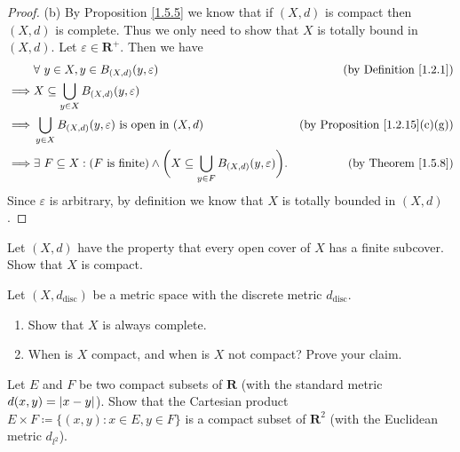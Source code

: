 \begin{proof}{(b)}
    By Proposition \ref{1.5.5} we know that if \((X, d)\) is compact then \((X, d)\) is complete.
    Thus we only need to show that \(X\) is totally bound in \((X, d)\).
    Let \(\varepsilon \in \mathbf{R}^+\).
    Then we have
    \begin{align*}
                 & \forall\ y \in X, y \in B_{(X, d)}(y, \varepsilon)                                                                         & \text{(by Definition \ref{1.2.1})}         \\
        \implies & X \subseteq \bigcup_{y \in X} B_{(X, d)}(y, \varepsilon)                                                                                                                \\
        \implies & \bigcup_{y \in X} B_{(X, d)}(y, \varepsilon) \text{ is open in } (X, d)                                                    & \text{(by Proposition \ref{1.2.15}(c)(g))} \\
        \implies & \exists\ F \subseteq X : (F \text{ is finite}) \land \bigg(X \subseteq \bigcup_{y \in F} B_{(X, d)}(y, \varepsilon)\bigg). & \text{(by Theorem \ref{1.5.8})}
    \end{align*}
    Since \(\varepsilon\) is arbitrary, by definition we know that \(X\) is totally bounded in \((X, d)\).
\end{proof}

\begin{exercise}\label{ex 1.5.11}
    Let \((X, d)\) have the property that every open cover of \(X\) has a finite subcover.
    Show that \(X\) is compact.
\end{exercise}

\begin{exercise}\label{ex 1.5.12}
    Let \((X, d_{\text{disc}})\) be a metric space with the discrete metric \(d_{\text{disc}}\).
    \begin{enumerate}
        \item Show that \(X\) is always complete.
        \item When is \(X\) compact, and when is \(X\) not compact?
              Prove your claim.
    \end{enumerate}
\end{exercise}

\begin{exercise}\label{ex 1.5.13}
    Let \(E\) and \(F\) be two compact subsets of \(\mathbf{R}\) (with the standard metric \(d(x, y) = \abs*{x - y}\)).
    Show that the Cartesian product \(E \times F \coloneqq \{(x, y) : x \in E, y \in F\}\) is a compact subset of \(\mathbf{R}^2\) (with the Euclidean metric \(d_{l^2}\)).
\end{exercise}

